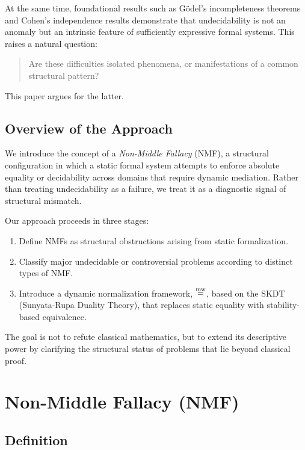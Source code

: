 \documentclass[11pt]{article}
\begin{document}
At the same time, foundational results such as Gödel's incompleteness
theorems and Cohen's independence results demonstrate that undecidability
is not an anomaly but an intrinsic feature of sufficiently expressive
formal systems.
This raises a natural question:

\begin{quote}
Are these difficulties isolated phenomena, or manifestations of a
common structural pattern?
\end{quote}

This paper argues for the latter.

\subsection{Overview of the Approach}

We introduce the concept of a \emph{Non-Middle Fallacy} (NMF), a structural
configuration in which a static formal system attempts to enforce
absolute equality or decidability across domains that require
dynamic mediation.
Rather than treating undecidability as a failure, we treat it as a
diagnostic signal of structural mismatch.

Our approach proceeds in three stages:

\begin{enumerate}
\item Define NMFs as structural obstructions arising from static
  formalization.
\item Classify major undecidable or controversial problems according
  to distinct types of NMF.
\item Introduce a dynamic normalization framework, $\mathbf{\mathrel{\overset{\mathrm{mw}}{=}}}$,
  based on the SKDT (Sunyata-Rupa Duality Theory),
  that replaces static equality with stability-based equivalence.
\end{enumerate}

The goal is not to refute classical mathematics, but to extend its
descriptive power by clarifying the structural status of problems
that lie beyond classical proof.

\section{Non-Middle Fallacy (NMF)}

\subsection{Definition}
\end{document}
